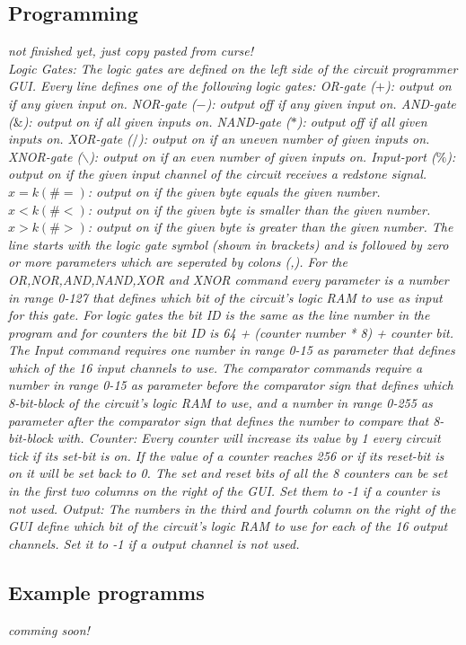 \documentclass[11pt]{article} %
\begin{document}
\subsection{Programming}
\it not finished yet, just copy pasted from curse!\rm\\
Logic Gates:
The logic gates are defined on the left side of the circuit programmer GUI.
Every line defines one of the following logic gates:
OR-gate ($+$): output on if any given input on.
NOR-gate ($-$): output off if any given input on.
AND-gate ($\&$): output on if all given inputs on.
NAND-gate ($*$): output off if all given inputs on.
XOR-gate ($/$): output on if an uneven number of given inputs on.
XNOR-gate ($\backslash$): output on if an even number of given inputs on.
Input-port ($\% $): output on if the given input channel of the circuit receives a redstone signal.
$x = k (\# = )$: output on if the given byte equals the given number.
$x < k (\# < )$: output on if the given byte is smaller than the given number.
$x > k (\# > )$: output on if the given byte is greater than the given number.
The line starts with the logic gate symbol (shown in brackets) and is followed by zero or more parameters which are seperated by colons (,).
For the OR,NOR,AND,NAND,XOR and XNOR command every parameter is a number in range 0-127 that defines which bit of the circuit's logic RAM to use as input for this gate.
For logic gates the bit ID is the same as the line number in the program and for counters the bit ID is 64 + (counter number * 8) + counter bit.
The Input command requires one number in range 0-15 as parameter that defines which of the 16 input channels to use.
The comparator commands require a number in range 0-15 as parameter before the comparator sign that defines which 8-bit-block of the circuit's logic RAM to use, and a number in range 0-255 as parameter after the comparator sign that defines the number to compare that 8-bit-block with.
Counter:
Every counter will increase its value by 1 every circuit tick if its set-bit is on.
If the value of a counter reaches 256 or if its reset-bit is on it will be set back to 0.
The set and reset bits of all the 8 counters can be set in the first two columns on the right of the GUI.
Set them to -1 if a counter is not used.
Output:
The numbers in the third and fourth column on the right of the GUI define which bit of the circuit's logic RAM to use for each of the 16 output channels.
Set it to -1 if a output channel is not used.


\subsection{Example programms}
\it comming soon!\rm
\end{document}
